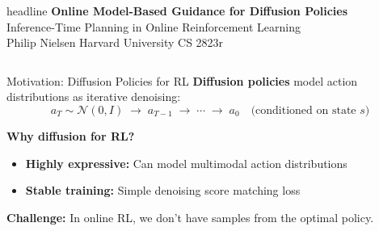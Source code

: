 \documentclass[final,hyperref={pdfpagelabels=false}]{beamer}
\newlength{\colwidth}
\begin{document}
\begin{frame}[t]

\begin{beamercolorbox}[wd=\paperwidth,ht=10cm]{headline}
\vspace{1cm}
\centering
{\fontsize{72}{80}\selectfont\bfseries Online Model-Based Guidance for Diffusion Policies}\\[0.8cm]
{\fontsize{42}{50}\selectfont Inference-Time Planning in Online Reinforcement Learning}\\[1cm]
{\fontsize{36}{44}\selectfont Philip Nielsen \hspace{3cm} Harvard University \hspace{3cm} CS 2823r}\\[0.5cm]
\end{beamercolorbox}

\vspace{1cm}

\begin{columns}[t]

\begin{column}{\colwidth}

\begin{block}{\Large Motivation: Diffusion Policies for RL}
\textbf{Diffusion policies} model action distributions as iterative denoising:
\[
a_T \sim \mathcal{N}(0, I) \;\to\; a_{T-1} \;\to\; \cdots \;\to\; a_0 \quad \text{(conditioned on state } s\text{)}
\]

\vspace{0.5em}
\textbf{Why diffusion for RL?}
\begin{itemize}
    \item \textbf{Highly expressive:} Can model multimodal action distributions
    \item \textbf{Stable training:} Simple denoising score matching loss
\end{itemize}

\vspace{0.5em}
\textbf{Challenge:} In online RL, we don't have samples from the optimal policy.


\end{block}
\end{column}
\end{columns}
\end{frame}
\end{document}
